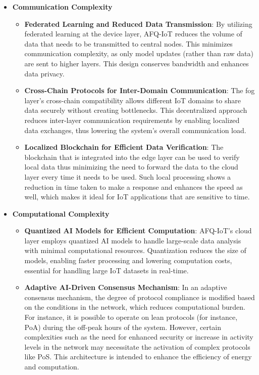 \documentclass[12pt, oneside]{report}
\begin{document}
\begin{itemize}

    \item \textbf{Communication Complexity}
    \begin{itemize}
        \item \textbf{Federated Learning and Reduced Data Transmission}: By utilizing federated learning at the device layer, AFQ-IoT reduces the volume of data that needs to be transmitted to central nodes. This minimizes communication complexity, as only model updates (rather than raw data) are sent to higher layers. This design conserves bandwidth and enhances data privacy.

        \item \textbf{Cross-Chain Protocols for Inter-Domain Communication}: The fog layer’s cross-chain compatibility allows different IoT domains to share data securely without creating bottlenecks. This decentralized approach reduces inter-layer communication requirements by enabling localized data exchanges, thus lowering the system's overall communication load.

        \item \textbf{Localized Blockchain for Efficient Data Verification}: The blockchain that is integrated into the edge layer can be used to verify local data thus minimizing the need to forward the data to the cloud layer every time it needs to be used. Such local processing shows a reduction in time taken to make a response and enhances the speed as well, which makes it ideal for IoT applications that are sensitive to time.
    \end{itemize}

    \item \textbf{Computational Complexity}
    \begin{itemize}
        \item \textbf{Quantized AI Models for Efficient Computation}: AFQ-IoT’s cloud layer employs quantized AI models to handle large-scale data analysis with minimal computational resources. Quantization reduces the size of models, enabling faster processing and lowering computation costs, essential for handling large IoT datasets in real-time.

        \item \textbf{Adaptive AI-Driven Consensus Mechanism}: In an adaptive consensus mechanism, the degree of protocol compliance is modified based on the conditions in the network, which reduces computational burden. For instance, it is possible to operate on lean protocols (for instance, PoA) during the off-peak hours of the system. However, certain complexities such as the need for enhanced security or increase in activity levels in the network may necessitate the activation of complex protocols like PoS. This architecture is intended to enhance the efficiency of energy and computation.


\end{itemize}
\end{itemize}
\end{document}
